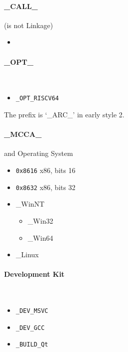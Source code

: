 \paragraph{\_CALL\_} (is not Linkage) \
\begin{itemize}
	\item%
\end{itemize}

\paragraph{\_OPT\_} \
\begin{itemize}
	\item \verb`_OPT_RISCV64`
\end{itemize}

The prefix is `\_ARC\_' in early style 2.

\paragraph{\_MCCA\_} and Operating System

\begin{itemize}
	\item \verb|0x8616| x86, bits 16
	\item \verb|0x8632| x86, bits 32
	\item \_WinNT \begin{itemize}
		\item \_Win32
		\item \_Win64
	\end{itemize}
	\item \_Linux
\end{itemize}

\paragraph{Development Kit} \
\begin{itemize}
\item \verb `_DEV_MSVC`
\item \verb `_DEV_GCC`
\item \verb `_BUILD_Qt` 
\end{itemize}
